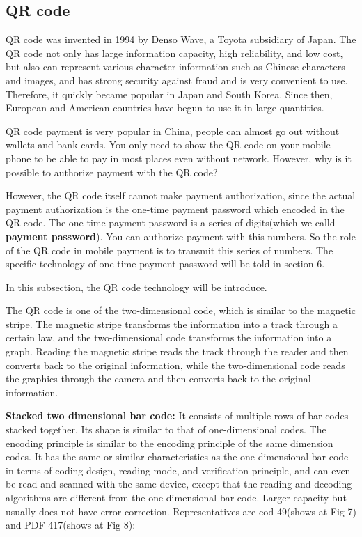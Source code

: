 \documentclass[journal]{IEEEtran}
\begin{document}
\subsection{QR code}
QR code was invented in 1994 by Denso Wave, a Toyota subsidiary of Japan. The QR code not only has large information capacity, high reliability, and low cost, but also can represent various character information such as Chinese characters and images, and has strong security against fraud and is very convenient to use. Therefore, it quickly became popular in Japan and South Korea. Since then, European and American countries have begun to use it in large quantities. 

QR code payment is very popular in China, people can almost go out without wallets and bank cards. You only need to show the QR code on your mobile phone to be able to pay in most places even without network. However, why is it possible to authorize payment with the QR code?

However, the QR code itself cannot make payment authorization, since the actual payment authorization is the one-time payment password which encoded in the QR code. The one-time payment password is a series of digits(which we calld \textbf{payment password}). You can authorize payment with this numbers. So the role of the QR code in mobile payment is to transmit this series of numbers. The specific technology of one-time payment password will be told in section 6.

In this subsection, the QR code technology will be introduce.

The QR code is one of the two-dimensional code, which is similar to the magnetic stripe. The magnetic stripe transforms the information into a track through a certain law, and the two-dimensional code transforms the information into a graph. Reading the magnetic stripe reads the track through the reader and then converts back to the original information, while the two-dimensional code reads the graphics through the camera and then converts back to the original information.

\textbf{Stacked two dimensional bar code:} It consists of multiple rows of bar codes stacked together. Its shape is similar to that of one-dimensional codes. The encoding principle is similar to the encoding principle of the same dimension codes. It has the same or similar characteristics as the one-dimensional bar code in terms of coding design, reading mode, and verification principle, and can even be read and scanned with the same device, except that the reading and decoding algorithms are different from the one-dimensional bar code. Larger capacity but usually does not have error correction.
Representatives are cod 49(shows at Fig 7) and PDF 417(shows at Fig 8):
\end{document}
